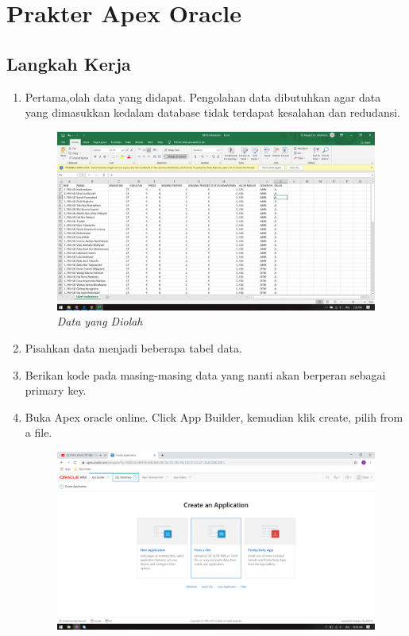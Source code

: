 \chapter{Prakter Apex Oracle}

\section{Langkah Kerja}
\begin{enumerate}
 \item Pertama,olah data yang didapat. Pengolahan data dibutuhkan agar data yang dimasukkan kedalam database tidak terdapat kesalahan dan redudansi.
  \begin{figure}[H]
    \centering
    \includegraphics[scale=0.3]{figures/data mentah}
    \caption{\textit{Data yang Diolah}}
    \label{foto11}
 \end{figure}
 \item Pisahkan data menjadi beberapa tabel data.
 \item Berikan kode pada masing-masing data yang nanti akan berperan sebagai primary key.
 \item Buka Apex oracle online. Click App Builder, kemudian klik create, pilih from a file.
 \begin{figure}[H]
    \centering
    \includegraphics[scale=0.3]{figures/4}

\end{figure}
\end{enumerate}
